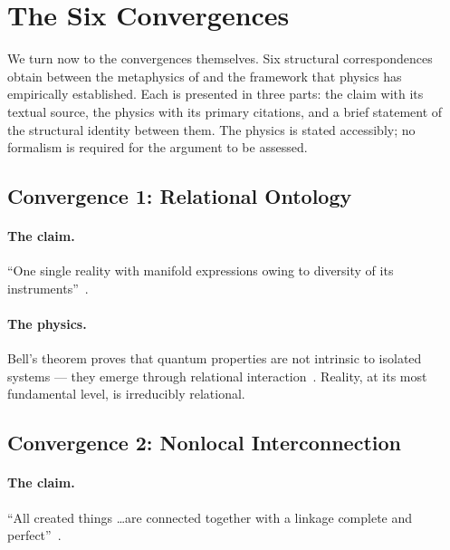 
\section{The Six Convergences}
\label{sec:convergences}


We turn now to the convergences themselves.
Six structural correspondences obtain between the \bahai metaphysics of
\mahabbat and the framework that physics has empirically established.
Each is presented in three parts: the \bahai claim with its textual source,
the physics with its primary citations, and a brief statement of the
structural identity between them.
The physics is stated accessibly; no formalism is required for the argument
to be assessed.

\subsection{Convergence 1: Relational Ontology}

\paragraph{The \bahai claim.}
``One single reality with manifold expressions owing to diversity of its
instruments''~\citep[\S 13.5]{BSW}.

\paragraph{The physics.}
Bell's theorem proves that quantum properties are not intrinsic to isolated
systems --- they emerge through relational interaction~\citep{Bell1964,Rovelli1996}.
Reality, at its most fundamental level, is irreducibly relational.

\subsection{Convergence 2: Nonlocal Interconnection}

\paragraph{The \bahai claim.}
``All created things \ldots are connected together with a linkage complete
and perfect''~\citep{SelectionsAbdul}.

